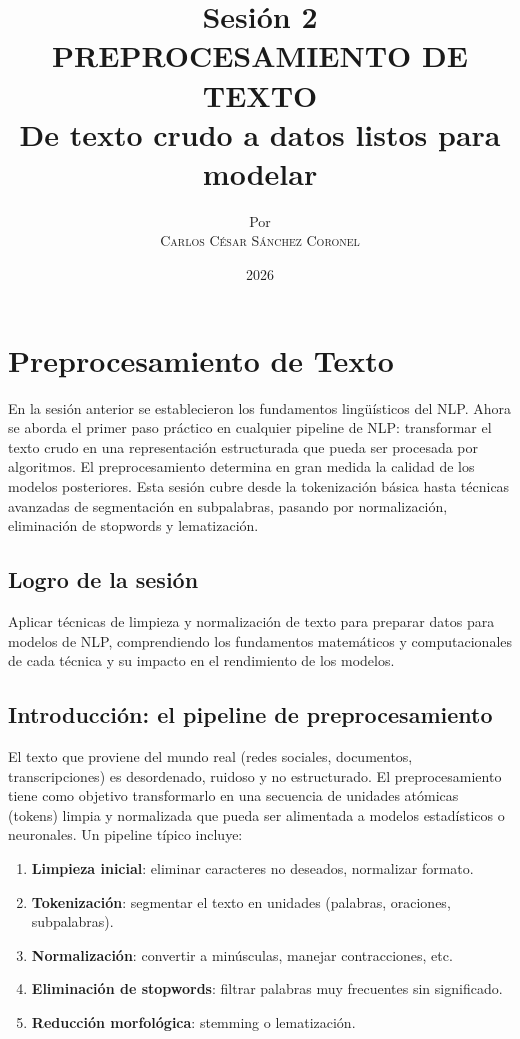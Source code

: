 \documentclass[12pt,a4paper,openany,oneside]{book}
\title{
    \textbf{Sesión 2} \\ 
    \Huge \textbf{PREPROCESAMIENTO DE TEXTO} \\
    \Large De texto crudo a datos listos para modelar
}
\author{
    \small Por \\ \vspace{0.2cm}
    \Large \textsc{Carlos César Sánchez Coronel}
}
\date{2026}
\begin{document}
\maketitle
\tableofcontents
{}

\chapter{Preprocesamiento de Texto}

En la sesión anterior se establecieron los fundamentos lingüísticos del NLP. Ahora se aborda el primer paso práctico en cualquier pipeline de NLP: transformar el texto crudo en una representación estructurada que pueda ser procesada por algoritmos. El preprocesamiento determina en gran medida la calidad de los modelos posteriores. Esta sesión cubre desde la tokenización básica hasta técnicas avanzadas de segmentación en subpalabras, pasando por normalización, eliminación de stopwords y lematización.

\section{Logro de la sesión}
Aplicar técnicas de limpieza y normalización de texto para preparar datos para modelos de NLP, comprendiendo los fundamentos matemáticos y computacionales de cada técnica y su impacto en el rendimiento de los modelos.

\section{Introducción: el pipeline de preprocesamiento}

El texto que proviene del mundo real (redes sociales, documentos, transcripciones) es desordenado, ruidoso y no estructurado. El preprocesamiento tiene como objetivo transformarlo en una secuencia de unidades atómicas (tokens) limpia y normalizada que pueda ser alimentada a modelos estadísticos o neuronales. Un pipeline típico incluye:

\begin{enumerate}
    \item \textbf{Limpieza inicial}: eliminar caracteres no deseados, normalizar formato.
    \item \textbf{Tokenización}: segmentar el texto en unidades (palabras, oraciones, subpalabras).
    \item \textbf{Normalización}: convertir a minúsculas, manejar contracciones, etc.
    \item \textbf{Eliminación de stopwords}: filtrar palabras muy frecuentes sin significado.
    \item \textbf{Reducción morfológica}: stemming o lematización.
\end{enumerate}
\end{document}
